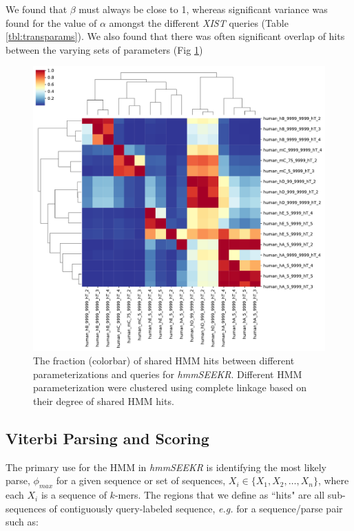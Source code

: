 We found that $\beta$ must always be close to 1, whereas significant variance was found for the value of $\alpha$ amongst the different \emph{XIST} queries (Table \ref{tbl:transparams}). We also found that there was often significant overlap of hits between the varying sets of parameters (Fig \ref{fig:overlapparams})

\begin{figure}[h]
\centering
\includegraphics[width=\textwidth]{images/intersection.pdf}
\caption[Overlap of HMM hits with different parameterizations]{The fraction (colorbar) of shared HMM hits between different parameterizations and queries for \emph{hmmSEEKR}. Different HMM parameterization were clustered using complete linkage based on their degree of shared HMM hits.}
\label{fig:overlapparams}
\end{figure}

\subsection{Viterbi Parsing and Scoring}
The primary use for the HMM in \emph{hmmSEEKR} is identifying the most likely parse, $\phi_{max}$ for a given sequence or set of sequences, $X_i \in \{X_1,X_2,\dots,X_n\}$, where each $X_i$ is a sequence of $k$-mers. The regions that we define as ``hits" are all sub-sequences of contiguously query-labeled sequence, \emph{e.g.} for a sequence/parse pair such as:

